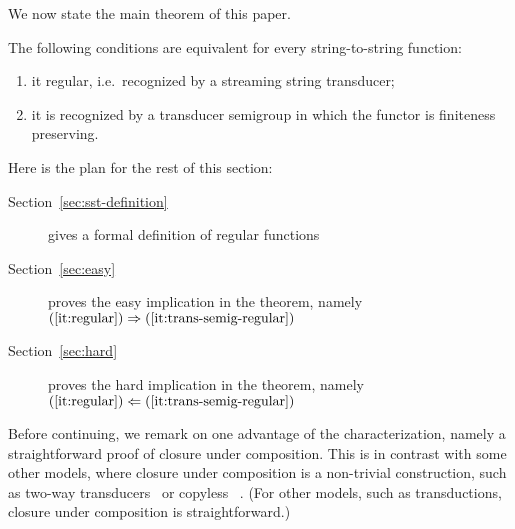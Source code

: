 We now state the main theorem of this paper. 


\begin{theorem}\label{thm:regular-functions}
    The following conditions are equivalent for every string-to-string function:
    \begin{enumerate}
        \item \label{it:regular} it regular, i.e.~recognized by a streaming string transducer;
        \item \label{it:trans-semig-regular}it is recognized by a transducer semigroup  in which the functor is finiteness preserving. 
    \end{enumerate}
\end{theorem}

\noindent Here is the plan for the rest of this section:
\begin{description}
    \item[Section~\ref{sec:sst-definition}] gives a formal definition of regular functions
    \item[Section~\ref{sec:easy}] proves the easy  implication in the theorem, namely  $(\ref{it:regular}) \Rightarrow (\ref{it:trans-semig-regular})$
    \item[Section~\ref{sec:hard}] proves the hard  implication in the theorem, namely  $(\ref{it:regular}) \Leftarrow (\ref{it:trans-semig-regular})$
\end{description}

Before continuing, we remark on one  advantage of the characterization, namely a straightforward proof of closure under composition. This is in contrast with some other models, where closure under composition is a non-trivial construction, such as two-way transducers~\cite[Theorem 2]{ChytilJ77} or copyless \sst~\cite[Theorem 1]{composingSST}. (For other models, such as \mso transductions, closure under composition is straightforward.)
 

